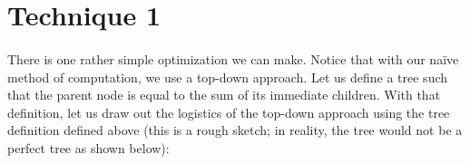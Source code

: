 \documentclass{article}
\begin{document}
    \section{Technique 1}
    	\paragraph{}
        	There is one rather simple optimization we can make.
            Notice that with our naïve method of computation, we use a top-down approach. 
            Let us define a tree such that the parent node is equal to the sum of its immediate children.
            With that definition, let us draw out the logistics of the top-down approach using the tree definition defined above
            (this is a rough sketch; in reality, the tree would not be a perfect tree as shown below):
            \subparagraph{}
\end{document}

